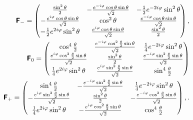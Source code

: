 \documentclass[%
  twocolumn,
 showpacs,
 showkeys,
 preprintnumbers,
 amsmath,amssymb,
 aps,
  pra,
  longbibliography,
 floatfix,
 ]{revtex4-1}
\begin{document}
\begin{equation}
\begin{split}
\textsf{\textbf{F}}_{-}
=
\begin{pmatrix}
\frac{\sin ^2\theta }{2} & -\frac{e^{-i \varphi } \cos \theta  \sin \theta }{\sqrt{2}} & -\frac{1}{2} e^{-2 i \varphi } \sin ^2\theta  \\
 -\frac{e^{i \varphi } \cos \theta  \sin \theta }{\sqrt{2}} & \cos ^2\theta  & \frac{e^{-i \varphi } \cos \theta  \sin \theta }{\sqrt{2}} \\
 -\frac{1}{2} e^{2 i \varphi } \sin ^2\theta  & \frac{e^{i \varphi } \cos \theta  \sin \theta }{\sqrt{2}} & \frac{\sin ^2\theta }{2}
\end{pmatrix}  ,
\\
\textsf{\textbf{F}}_{0}
=
\begin{pmatrix}
\cos ^4\frac{\theta }{2} & \frac{e^{-i \varphi } \cos^2 \frac{\theta}{2} \sin \theta }{ \sqrt{2}} & \frac{1}{4} e^{-2 i \varphi } \sin ^2\theta  \\
 \frac{e^{i \varphi } \cos^2 \frac{\theta}{2} \sin \theta }{ \sqrt{2}} & \frac{\sin ^2\theta }{2} & \frac{e^{-i \varphi } \sin ^2\frac{\theta }{2} \sin \theta }{\sqrt{2}} \\
 \frac{1}{4} e^{2 i \varphi } \sin ^2\theta  & \frac{e^{i \varphi } \sin ^2\frac{\theta }{2} \sin \theta }{\sqrt{2}} & \sin ^4\frac{\theta }{2}
\end{pmatrix}
   \\
\textsf{\textbf{F}}_{+}
=
\begin{pmatrix}
\sin ^4\frac{\theta }{2} & -\frac{e^{-i \varphi } \sin ^2\frac{\theta }{2} \sin \theta }{\sqrt{2}} & \frac{1}{4} e^{-2 i \varphi } \sin ^2\theta  \\
 -\frac{e^{i \varphi } \sin ^2\frac{\theta }{2} \sin \theta }{\sqrt{2}} & \frac{\sin ^2\theta }{2} & -\frac{e^{-i \varphi } \cos^2 \frac{\theta}{2} \sin \theta }{\sqrt{2}} \\
 \frac{1}{4} e^{2 i \varphi } \sin ^2\theta  & -\frac{e^{i \varphi } \cos^2 \frac{\theta}{2} \sin \theta }{ \sqrt{2}} & \cos ^4\frac{\theta }{2}
\end{pmatrix}  ,
.
\end{split}
\label{e-2009-gtq-s2f}
\end{equation}
\end{document}
